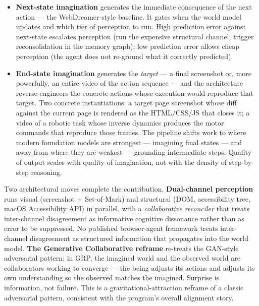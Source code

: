 \documentclass[12pt]{article}
\providecommand{\tightlist}{%
  \setlength{\itemsep}{0pt}\setlength{\parskip}{0pt}}
\begin{document}
\begin{itemize}
\tightlist
\item
  \textbf{Next-state imagination} generates the immediate consequence of the next action --- the WebDreamer-style baseline. It gates when the world model updates and which tier of perception to run. High prediction error against next-state escalates perception (run the expensive structural channel; trigger reconsolidation in the memory graph); low prediction error allows cheap perception (the agent does not re-ground what it correctly predicted).
\item
  \textbf{End-state imagination} generates the \emph{target} --- a final screenshot or, more powerfully, an entire video of the action sequence --- and the architecture reverse-engineers the concrete actions whose execution would reproduce that target. Two concrete instantiations: a target page screenshot whose diff against the current page is rendered as the HTML/CSS/JS that closes it; a video of a robotic task whose inverse dynamics produces the motor commands that reproduce those frames. The pipeline shifts work to where modern foundation models are strongest --- imagining final states --- and away from where they are weakest --- grounding intermediate steps. Quality of output scales with quality of imagination, not with the density of step-by-step reasoning.
\end{itemize}

Two architectural moves complete the contribution. \textbf{Dual-channel perception} runs visual (screenshot + Set-of-Mark) and structural (DOM, accessibility tree, macOS Accessibility API) in parallel, with a \emph{collaborative reconciler} that treats inter-channel disagreement as informative cognitive dissonance rather than as error to be suppressed. No published browser-agent framework treats inter-channel disagreement as structured information that propagates into the world model. \textbf{The Generative Collaborative reframe} re-treats the GAN-style adversarial pattern: in GRP, the imagined world and the observed world are collaborators working to converge --- the being adjusts its actions and adjusts its own understanding so the observed matches the imagined. Surprise is information, not failure. This is a gravitational-attraction reframe of a classic adversarial pattern, consistent with the program's overall alignment story.
\end{document}
